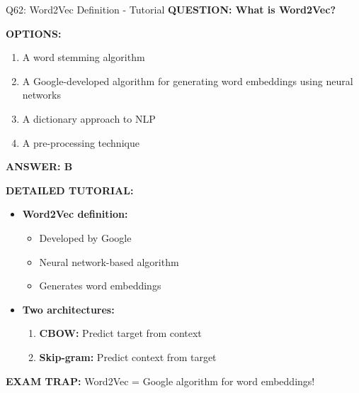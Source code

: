 \documentclass[8pt]{beamer}
\begin{document}
	\begin{frame}{Q62: Word2Vec Definition - Tutorial}
		\fontsize{6.5}{7.5}\selectfont
		\textbf{QUESTION: What is Word2Vec?}
		
		\vspace{0.1cm}
		\textbf{OPTIONS:}
		\begin{enumerate}
			\item A word stemming algorithm
			\item A Google-developed algorithm for generating word embeddings using neural networks
			\item A dictionary approach to NLP
			\item A pre-processing technique
		\end{enumerate}
		
		\vspace{0.1cm}
		\textcolor{myblue}{\textbf{ANSWER: B}}
		
		\vspace{0.1cm}
		\textbf{DETAILED TUTORIAL:}
		\begin{itemize}
			\item \textbf{Word2Vec definition:}
			\begin{itemize}
				\item Developed by Google
				\item Neural network-based algorithm
				\item Generates word embeddings
			\end{itemize}
			\item \textbf{Two architectures:}
			\begin{enumerate}
				\item \textbf{CBOW:} Predict target from context
				\item \textbf{Skip-gram:} Predict context from target
			\end{enumerate}
		\end{itemize}
		
		\textcolor{myred}{\textbf{EXAM TRAP:}} Word2Vec = \textcolor{myblue}{Google algorithm for word embeddings}!
	\end{frame}
	
\end{document}

